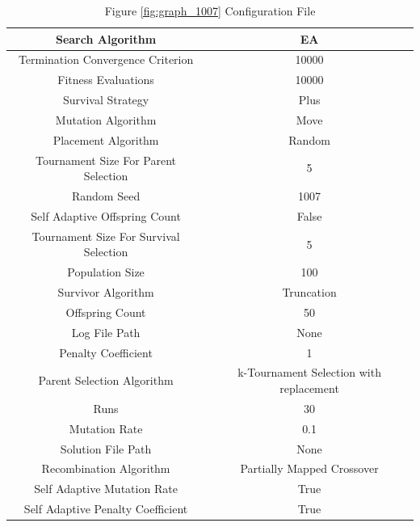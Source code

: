 \documentclass{standalone}
\begin{document}
\begin{table}[!htb]
	\centering
	\caption{Figure \ref{fig:graph_1007} Configuration File}
	\label{tab:graph_1007}
	\begin{tabular}{| c | c |}
		\hline
		Search Algorithm		& EA		 \\
		\hline
		Termination Convergence Criterion		& 10000		 \\
		\hline
		Fitness Evaluations		& 10000		 \\
		\hline
		Survival Strategy		& Plus		 \\
		\hline
		Mutation Algorithm		& Move		 \\
		\hline
		Placement Algorithm		& Random		 \\
		\hline
		Tournament Size For Parent Selection		& 5		 \\
		\hline
		Random Seed		& 1007		 \\
		\hline
		Self Adaptive Offspring Count		& False		 \\
		\hline
		Tournament Size For Survival Selection		& 5		 \\
		\hline
		Population Size		& 100		 \\
		\hline
		Survivor Algorithm		& Truncation		 \\
		\hline
		Offspring Count		& 50		 \\
		\hline
		Log File Path		& None		 \\
		\hline
		Penalty Coefficient		& 1		 \\
		\hline
		Parent Selection Algorithm		& k-Tournament Selection with replacement		 \\
		\hline
		Runs		& 30		 \\
		\hline
		Mutation Rate		& 0.1		 \\
		\hline
		Solution File Path		& None		 \\
		\hline
		Recombination Algorithm		& Partially Mapped Crossover		 \\
		\hline
		Self Adaptive Mutation Rate		& True		 \\
		\hline
		Self Adaptive Penalty Coefficient		& True		 \\
		\hline
	\end{tabular}
\end{table}
\end{document}
